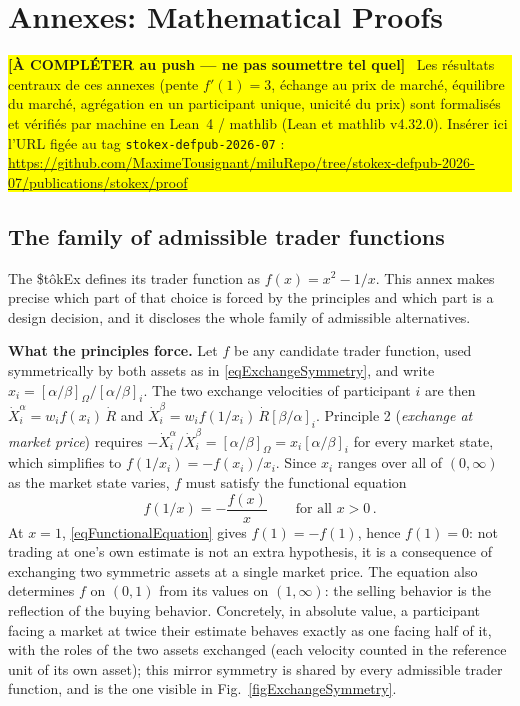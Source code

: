 \documentclass[letterpaper]{article}
\newcommand{\priceAB}{\left[\alpha / \beta\right]}
\newcommand{\priceBA}{\left[\beta / \alpha\right]}
\newcommand{\StokEx}{\$t\^{o}kEx}
\newcommand{\placeholder}[1]{%
  \par\smallskip\noindent
  \colorbox{yellow}{\parbox{\dimexpr\linewidth-2\fboxsep\relax}{#1}}%
  \par\smallskip}
\begin{document}
\clearpage
\section{Annexes: Mathematical Proofs}

\placeholder{\textbf{[À COMPLÉTER au push --- ne pas soumettre tel quel]}~ Les
résultats centraux de ces annexes (pente $f'(1)=3$, échange au prix de marché,
équilibre du marché, agrégation en un participant unique, unicité du prix) sont
formalisés et vérifiés par machine en Lean~4 / mathlib (Lean et mathlib
v4.32.0). Insérer ici l'URL figée au tag \texttt{stokex-defpub-2026-07} :
\url{https://github.com/MaximeTousignant/miluRepo/tree/stokex-defpub-2026-07/publications/stokex/proof}}

\subsection{The family of admissible trader functions}\label{secTraderFamily}

The \StokEx{} defines its trader function as $f(x) = x^2 - 1/x$. This annex makes precise which part of that choice is forced by the principles and which part is a design decision, and it discloses the whole family of admissible alternatives.

\textbf{What the principles force.} Let $f$ be any candidate trader function, used symmetrically by both assets as in \eqref{eqExchangeSymmetry}, and write $x_i = \priceAB_\Omega / \priceAB_i$. The two exchange velocities of participant $i$ are then $\dot{X}^\alpha_i = w_i f(x_i)\, \dot{R}$ and $\dot{X}^\beta_i = w_i f(1/x_i)\, \dot{R} \priceBA_i$. Principle 2 (\emph{exchange at market price}) requires $-\dot{X}^\alpha_i / \dot{X}^\beta_i = \priceAB_\Omega = x_i \priceAB_i$ for every market state, which simplifies to $f(1/x_i) = -f(x_i)/x_i$. Since $x_i$ ranges over all of $(0,\infty)$ as the market state varies, $f$ must satisfy the functional equation
\begin{equation}
    f(1/x) = -\frac{f(x)}{x} \qquad \text{for all } x > 0\,. \label{eqFunctionalEquation}
\end{equation}
At $x = 1$, \eqref{eqFunctionalEquation} gives $f(1) = -f(1)$, hence $f(1) = 0$: not trading at one's own estimate is not an extra hypothesis, it is a consequence of exchanging two symmetric assets at a single market price. The equation also determines $f$ on $(0,1)$ from its values on $(1,\infty)$: the selling behavior is the reflection of the buying behavior. Concretely, in absolute value, a participant facing a market at twice their estimate behaves exactly as one facing half of it, with the roles of the two assets exchanged (each velocity counted in the reference unit of its own asset); this mirror symmetry is shared by every admissible trader function, and is the one visible in Fig.~\ref{figExchangeSymmetry}.
\end{document}
